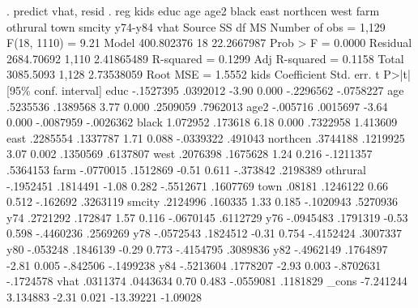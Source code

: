 . predict vhat, resid
{\smallskip}
. reg kids educ age age2 black east northcen west farm othrural town smcity y74-y84 vhat
{\smallskip}
      Source {\VBAR}       SS           df       MS      Number of obs   =     1,129
   F(18, 1110)     =      9.21
       Model {\VBAR}  400.802376        18  22.2667987   Prob > F        =    0.0000
    Residual {\VBAR}  2684.70692     1,110  2.41865489   R-squared       =    0.1299
   Adj R-squared   =    0.1158
       Total {\VBAR}   3085.5093     1,128  2.73538059   Root MSE        =    1.5552
{\smallskip}
        kids {\VBAR} Coefficient  Std. err.      t    P>|t|     [95\% conf. interval]
        educ {\VBAR}  -.1527395   .0392012    -3.90   0.000    -.2296562   -.0758227
         age {\VBAR}   .5235536   .1389568     3.77   0.000     .2509059    .7962013
        age2 {\VBAR}   -.005716   .0015697    -3.64   0.000    -.0087959   -.0026362
       black {\VBAR}   1.072952    .173618     6.18   0.000     .7322958    1.413609
        east {\VBAR}   .2285554   .1337787     1.71   0.088    -.0339322     .491043
    northcen {\VBAR}   .3744188   .1219925     3.07   0.002     .1350569    .6137807
        west {\VBAR}   .2076398   .1675628     1.24   0.216    -.1211357    .5364153
        farm {\VBAR}  -.0770015   .1512869    -0.51   0.611     -.373842    .2198389
    othrural {\VBAR}  -.1952451   .1814491    -1.08   0.282    -.5512671    .1607769
        town {\VBAR}     .08181   .1246122     0.66   0.512     -.162692    .3263119
      smcity {\VBAR}   .2124996    .160335     1.33   0.185    -.1020943    .5270936
         y74 {\VBAR}   .2721292    .172847     1.57   0.116    -.0670145    .6112729
         y76 {\VBAR}  -.0945483   .1791319    -0.53   0.598    -.4460236    .2569269
         y78 {\VBAR}  -.0572543   .1824512    -0.31   0.754    -.4152424    .3007337
         y80 {\VBAR}   -.053248   .1846139    -0.29   0.773    -.4154795    .3089836
         y82 {\VBAR}  -.4962149   .1764897    -2.81   0.005     -.842506   -.1499238
         y84 {\VBAR}  -.5213604   .1778207    -2.93   0.003    -.8702631   -.1724578
        vhat {\VBAR}   .0311374   .0443634     0.70   0.483    -.0559081    .1181829
       _cons {\VBAR}  -7.241244   3.134883    -2.31   0.021    -13.39221    -1.09028
{\smallskip}
